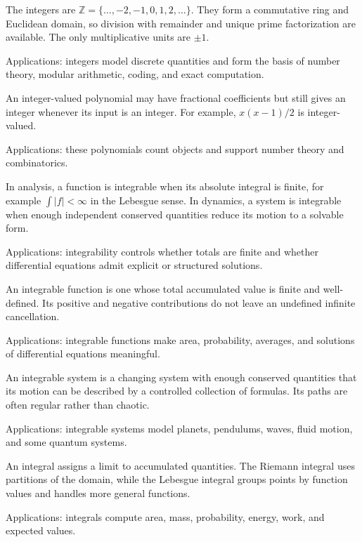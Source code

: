 The integers are $\mathbb Z=\{\ldots,-2,-1,0,1,2,\ldots\}$. They form a commutative ring and Euclidean domain, so division with remainder and unique prime factorization are available. The only multiplicative units are $\pm1$. \par\noindent Applications: integers model discrete quantities and form the basis of number theory, modular arithmetic, coding, and exact computation.

An integer-valued polynomial may have fractional coefficients but still gives an integer whenever its input is an integer. For example, $x(x-1)/2$ is integer-valued. \par\noindent Applications: these polynomials count objects and support number theory and combinatorics.

In analysis, a function is integrable when its absolute integral is finite, for example $\int|f|<\infty$ in the Lebesgue sense. In dynamics, a system is integrable when enough independent conserved quantities reduce its motion to a solvable form. \par\noindent Applications: integrability controls whether totals are finite and whether differential equations admit explicit or structured solutions.

An integrable function is one whose total accumulated value is finite and well-defined. Its positive and negative contributions do not leave an undefined infinite cancellation. \par\noindent Applications: integrable functions make area, probability, averages, and solutions of differential equations meaningful.

An integrable system is a changing system with enough conserved quantities that its motion can be described by a controlled collection of formulas. Its paths are often regular rather than chaotic. \par\noindent Applications: integrable systems model planets, pendulums, waves, fluid motion, and some quantum systems.

An integral assigns a limit to accumulated quantities. The Riemann integral uses partitions of the domain, while the Lebesgue integral groups points by function values and handles more general functions. \par\noindent Applications: integrals compute area, mass, probability, energy, work, and expected values.


